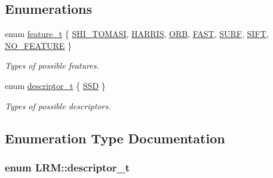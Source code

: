 \subsection*{\-Enumerations}
\begin{DoxyCompactItemize}
\item 
enum \hyperlink{namespaceLRM_a8eb6956b84fb7d27bce5af771937794f}{feature\-\_\-t} \{ \*
\hyperlink{namespaceLRM_a8eb6956b84fb7d27bce5af771937794fa8e3a2d26370c85d7adb97cbbd40abc72}{\-S\-H\-I\-\_\-\-T\-O\-M\-A\-S\-I}, 
\hyperlink{namespaceLRM_a8eb6956b84fb7d27bce5af771937794fa82f8a835c4a989b4beddacd8082dc75d}{\-H\-A\-R\-R\-I\-S}, 
\hyperlink{namespaceLRM_a8eb6956b84fb7d27bce5af771937794fa7c70db53c6ef257d06ad41cd33ea8c42}{\-O\-R\-B}, 
\hyperlink{namespaceLRM_a8eb6956b84fb7d27bce5af771937794fa68bc6d3980e55f5e357855916be07ab9}{\-F\-A\-S\-T}, 
\*
\hyperlink{namespaceLRM_a8eb6956b84fb7d27bce5af771937794fabace5d3a329784433515af3067c3e9d9}{\-S\-U\-R\-F}, 
\hyperlink{namespaceLRM_a8eb6956b84fb7d27bce5af771937794fab88abdea089ea29c5224698eb2215891}{\-S\-I\-F\-T}, 
\hyperlink{namespaceLRM_a8eb6956b84fb7d27bce5af771937794faa8a3283e5421c1218d8238e56c80a104}{\-N\-O\-\_\-\-F\-E\-A\-T\-U\-R\-E}
 \}
\begin{DoxyCompactList}\small\item\em \-Types of possible features. \end{DoxyCompactList}\item 
enum \hyperlink{namespaceLRM_ad31d475a7f32e1bd208beb34aabc6fa9}{descriptor\-\_\-t} \{ \hyperlink{namespaceLRM_ad31d475a7f32e1bd208beb34aabc6fa9a1e43a18048d2fc5fc782f2eebce0d585}{\-S\-S\-D}
 \}
\begin{DoxyCompactList}\small\item\em \-Types of possible descriptors. \end{DoxyCompactList}\end{DoxyCompactItemize}


\subsection{\-Enumeration \-Type \-Documentation}
\hypertarget{namespaceLRM_ad31d475a7f32e1bd208beb34aabc6fa9}{
\subsubsection[{descriptor\-\_\-t}]{\setlength{\rightskip}{0pt plus 5cm}enum {\bf \-L\-R\-M\-::descriptor\-\_\-t}}}\label{namespaceLRM_ad31d475a7f32e1bd208beb34aabc6fa9}


